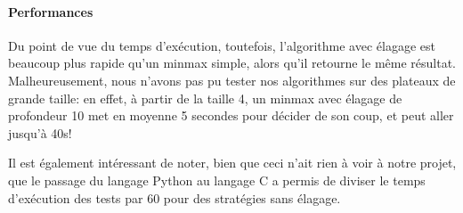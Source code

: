 \paragraph{Performances}
Du point de vue du temps d'exécution, toutefois, l'algorithme avec
élagage est beaucoup plus rapide qu'un minmax simple, alors qu'il
retourne le même résultat.
Malheureusement, nous n'avons pas pu tester nos algorithmes sur des
plateaux de grande taille: en effet, à partir de la taille 4, un
minmax avec élagage de profondeur 10 met en moyenne 5 secondes pour
décider de son coup, et peut aller jusqu'à 40s!

Il est également intéressant de noter, bien que ceci n'ait rien à voir
à notre projet, que le passage du langage Python au langage C a permis
de diviser le temps d'exécution des tests par 60 pour des stratégies
sans élagage.
